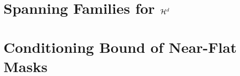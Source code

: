 \chapter{Spanning Families for $\mathcal{H}^d$}
\label{app:gam_span_herm}

\chapter{Conditioning Bound of Near-Flat Masks}
\label{app:nearflat_more}

